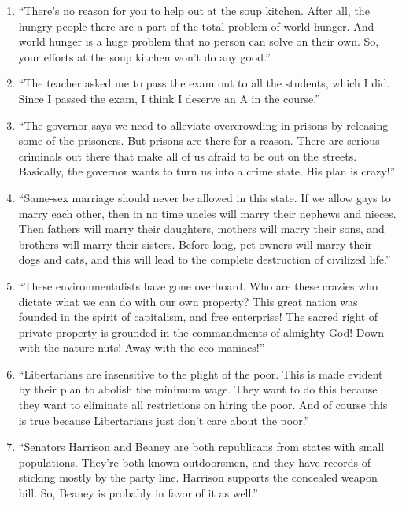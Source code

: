 \documentclass[10pt]{article}
\begin{document}
\begin{enumerate}
  \setlength\itemsep{45pt}

  \item ``There's no reason for you to help out at the soup kitchen.  After all, the hungry people there are a part of the total problem of world hunger.  And world hunger is a huge problem that no person can solve on their own. So, your efforts at the soup kitchen won't do any good.''
  
  \item ``The teacher asked me to pass the exam out to all the students, which I did.  Since I passed the exam, I think I deserve an A in the course.''
  
  \item ``The governor says we need to alleviate overcrowding in prisons by releasing some of the prisoners.  But prisons are there for a reason.  There are serious criminals out there that make all of us afraid to be out on the streets.  Basically, the governor wants to turn us into a crime state. His plan is crazy!''
  
  \item ``Same-sex marriage should never be allowed in this state. If we allow gays to marry each other, then in no time uncles will marry their nephews and nieces. Then fathers will marry their daughters, mothers will marry their sons, and brothers will marry their sisters. Before
long, pet owners will marry their dogs and cats, and this will lead to the complete destruction of civilized life.''

  \item ``These environmentalists have gone overboard. Who are these crazies who dictate what we can do with our own property? This great nation was founded in the spirit of capitalism, and free enterprise! The sacred right of private property is grounded in the commandments of almighty God! Down with the nature-nuts! Away with the eco-maniacs!''
  
  \item ``Libertarians are insensitive to the plight of the poor. This is made evident by their plan to abolish the minimum wage. They want to do this because they want to eliminate all restrictions on hiring the poor. And of course this is true because Libertarians just don't care about the poor.''
  
  \item ``Senators Harrison and Beaney are both republicans from states with small populations.  They're both known outdoorsmen, and they have records of sticking mostly by the party line.  Harrison supports the concealed weapon bill.  So, Beaney is probably in favor of it as well.''
  

\end{enumerate}
\end{document}

